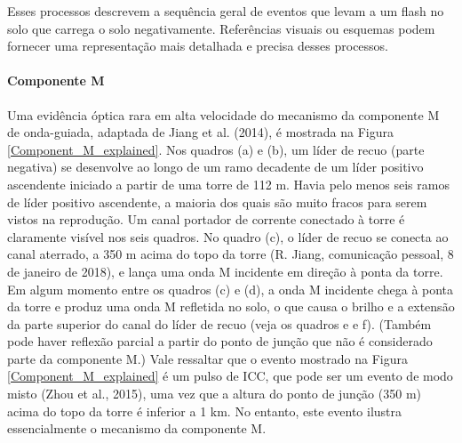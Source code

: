 \documentclass[a4paper, 12pt, onecolumn,singlespacing]{article}
\begin{document}
		Esses processos descrevem a sequência geral de eventos que levam a um flash no solo que carrega o solo negativamente. Referências visuais ou esquemas podem fornecer uma representação mais detalhada e precisa desses processos.
		
		\paragraph{Componente M} Uma evidência óptica rara em alta velocidade do mecanismo da componente M de onda-guiada, adaptada de Jiang et al. (2014), é mostrada na Figura \ref{Component_M_explained}. Nos quadros (a) e (b), um líder de recuo (parte negativa) se desenvolve ao longo de um ramo decadente de um líder positivo ascendente iniciado a partir de uma torre de 112 m. Havia pelo menos seis ramos de líder positivo ascendente, a maioria dos quais são muito fracos para serem vistos na reprodução. Um canal portador de corrente conectado à torre é claramente visível nos seis quadros. No quadro (c), o líder de recuo se conecta ao canal aterrado, a 350 m acima do topo da torre (R. Jiang, comunicação pessoal, 8 de janeiro de 2018), e lança uma onda M incidente em direção à ponta da torre. Em algum momento entre os quadros (c) e (d), a onda M incidente chega à ponta da torre e produz uma onda M refletida no solo, o que causa o brilho e a extensão da parte superior do canal do líder de recuo (veja os quadros e e f). (Também pode haver reflexão parcial a partir do ponto de junção que não é considerado parte da componente M.) Vale ressaltar que o evento mostrado na Figura \ref{Component_M_explained} é um pulso de ICC, que pode ser um evento de modo misto (Zhou et al., 2015), uma vez que a altura do ponto de junção (350 m) acima do topo da torre é inferior a 1 km. No entanto, este evento ilustra essencialmente o mecanismo da componente M.
		
\end{document}

